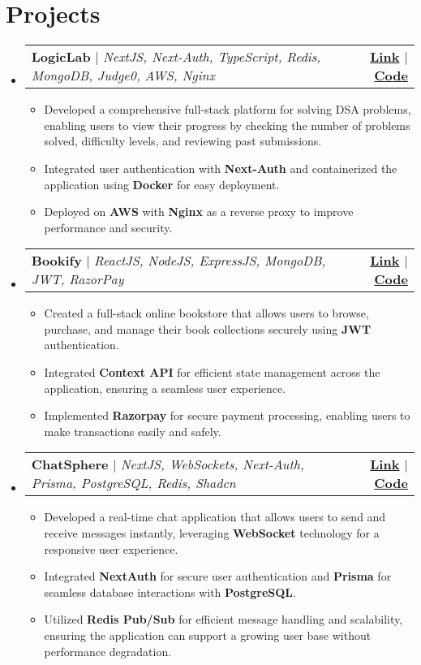 \documentclass[letterpaper,11pt]{article}
\makeatletter
\newcommand{\resumeItem}[1]{
  \item\small{
    {#1 \vspace{-2pt}}
  }
}
\newcommand{\resumeProjectHeading}[2]{
    \item
    \begin{tabular*}{1.001\textwidth}{l@{\extracolsep{\fill}}r}
      \small#1 & \textbf{\small #2}\\
    \end{tabular*}\vspace{-7pt}
}
\newcommand{\resumeSubHeadingListStart}{\begin{itemize}[leftmargin=0.0in, label={}]}
\newcommand{\resumeSubHeadingListEnd}{\end{itemize}}
\newcommand{\resumeItemListStart}{\begin{itemize}}
\newcommand{\resumeItemListEnd}{\end{itemize}\vspace{-5pt}}
\makeatother
\begin{document}
\section{Projects}
    \vspace{-5pt}
    \resumeSubHeadingListStart
      \resumeProjectHeading
          {\textbf{LogicLab} $|$ \emph{NextJS, Next-Auth, TypeScript, Redis, MongoDB, Judge0, AWS, Nginx}}{ \href{https://logic-lab.work.gd/}{Link} $|$ \href{https://github.com/Aman-Meenia/logiclab}{Code} }
          \resumeItemListStart
            \resumeItem{Developed a comprehensive full-stack platform for solving DSA problems, enabling users to view their progress by checking the number of problems solved, difficulty levels, and reviewing past submissions.}
            \resumeItem{Integrated user authentication with \textbf{Next-Auth} and containerized the application using \textbf{Docker} for easy deployment.}
            \resumeItem{Deployed on \textbf{AWS} with \textbf{Nginx} as a reverse proxy to improve performance and security.}
          \resumeItemListEnd
          \vspace{-13pt}
      \resumeProjectHeading
          {\textbf{Bookify} $|$ \emph{ReactJS, NodeJS, ExpressJS, MongoDB, JWT, RazorPay}}{ \href{https://youtu.be/QczbMU5eWbA?t=114}{Link} $|$ \href{https://github.com/Aman-Meenia/BookStore}{Code} }
          \resumeItemListStart
            \resumeItem{Created a full-stack online bookstore that allows users to browse, purchase, and manage their book collections securely using \textbf{JWT} authentication.}
            \resumeItem{Integrated \textbf{Context API} for efficient state management across the application, ensuring a seamless user experience.}
            \resumeItem{Implemented \textbf{Razorpay} for secure payment processing, enabling users to make transactions easily and safely.}
          \resumeItemListEnd 
          \vspace{-13pt}
          \resumeProjectHeading
          {\textbf{ChatSphere} $|$ \emph{NextJS, WebSockets, Next-Auth, Prisma, PostgreSQL, Redis, Shadcn}}{ \href{https://aman-meenia.work.gd/login}{Link} $|$ \href{https://github.com/Aman-Meenia/chatsphere}{Code} }
          \resumeItemListStart
            \resumeItem{Developed a real-time chat application that allows users to send and receive messages instantly, leveraging \textbf{WebSocket} technology for a responsive user experience.}
            \resumeItem{Integrated \textbf{NextAuth} for secure user authentication and \textbf{Prisma} for seamless database interactions with \textbf{PostgreSQL}.}
            \resumeItem{Utilized \textbf{ Redis Pub/Sub} for efficient message handling and scalability, ensuring the application can support a growing user base without performance degradation.}
          \resumeItemListEnd 
    \resumeSubHeadingListEnd
\vspace{-15pt}
\end{document}
